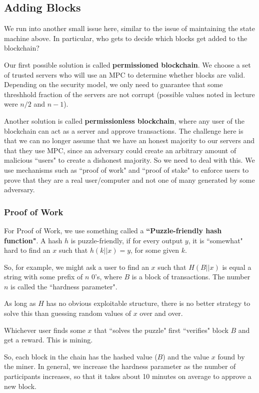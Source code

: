\documentclass[11pt]{article}
\newcommand{\tb}{\textbf}
\begin{document}
\subsection{Adding Blocks}
We run into another small issue here, similar to the issue of maintaining the state machine above. In particular, who gets to decide which blocks get added to the blockchain?\medskip

Our first possible solution is called \tb{permissioned blockchain}. We choose a set of trusted servers who will use an MPC to determine whether blocks are valid. Depending on the security model, we only need to guarantee that some threshhold fraction of the servers are not corrupt (possible values noted in lecture were \(n/2\) and \(n-1\)).\medskip

Another solution is called \tb{permissionless blockchain}, where any user of the blockchain can act as a server and approve transactions. The challenge here is that we can no longer assume that we have an honest majority to our servers and that they use MPC, since an adversary could create an arbitrary amount of malicious ``users" to create a dishonest majority. So we need to deal with this. We use mechanisms such as ``proof of work" and ``proof of stake" to enforce users to prove that they are a real user/computer and not one of many generated by some adversary.

\subsubsection{Proof of Work}
For Proof of Work, we use something called a \tb{``Puzzle-friendly hash function"}. A hash \(h\) is puzzle-friendly, if for every output \(y\), it is ``somewhat" hard to find an \(x\) such that \(h(k||x) = y\), for some given \(k\).\smallskip

So, for example, we might ask a user to find an \(x\) such that \(H(B||x)\) is equal a string with some prefix of \(n\) \(0\)'s, where \(B\) is a block of transactions. The number \(n\) is called the ``hardness parameter".

As long as \(H\) has no obvious exploitable structure, there is no better strategy to solve this than guessing random values of \(x\) over and over.

Whichever user finds some \(x\) that ``solves the puzzle" first ``verifies" block \(B\) and get a reward. This is mining.\smallskip

So, each block in the chain has the hashed value (\(B\)) and the value \(x\) found by the miner.
In general, we increase the hardness parameter as the number of participants increases, so that it takes about 10 minutes on average to approve a new block.\medskip
\end{document}

